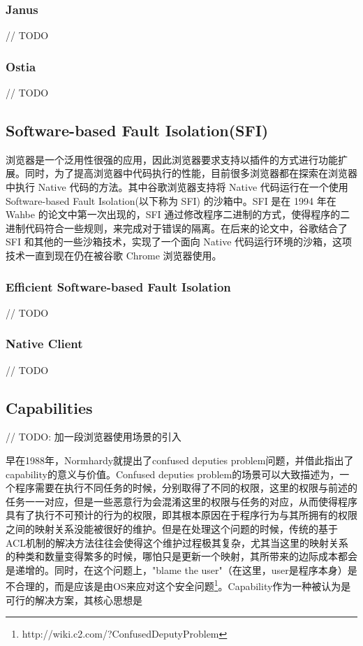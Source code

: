 \documentclass[preprint,12pt]{elsarticle}
\begin{document}
\subsubsection{Janus}
\label{sss:janus}

// TODO

\subsubsection{Ostia}
\label{sss:ostia}

// TODO

\subsection{Software-based Fault Isolation(SFI)}
\label{ss:sfi}

浏览器是一个泛用性很强的应用，因此浏览器要求支持以插件的方式进行功能扩展。同时，为了提高浏览器中代码执行的性能，目前很多浏览器都在探索在浏览器中执行 Native 代码的方法。其中谷歌浏览器支持将 Native 代码运行在一个使用 Software-based Fault Isolation(以下称为 SFI) 的沙箱中。SFI 是在 1994 年在 Wahbe 的论文中第一次出现的\cite{wahbe1994efficient}，SFI 通过修改程序二进制的方式，使得程序的二进制代码符合一些规则，来完成对于错误的隔离。在后来的论文中，谷歌结合了 SFI 和其他的一些沙箱技术，实现了一个面向 Native 代码运行环境的沙箱，这项技术一直到现在仍在被谷歌 Chrome 浏览器使用\cite{nacl}。

\subsubsection{Efficient Software-based Fault Isolation}
\label{sss:esfi}

// TODO

\subsubsection{Native Client}
\label{sss:nacl}

// TODO

\subsection{Capabilities}
\label{ss:capabilities}

// TODO: 加一段浏览器使用场景的引入

早在1988年，Normhardy就提出了confused deputies problem\cite{deputies}问题，并借此指出了capability的意义与价值。Confused deputies problem的场景可以大致描述为，一个程序需要在执行不同任务的时候，分别取得了不同的权限，这里的权限与前述的任务一一对应，但是一些恶意行为会混淆这里的权限与任务的对应，从而使得程序具有了执行不可预计的行为的权限，即其根本原因在于程序行为与其所拥有的权限之间的映射关系没能被很好的维护。但是在处理这个问题的时候，传统的基于ACL机制的解决方法往往会使得这个维护过程极其复杂，尤其当这里的映射关系的种类和数量变得繁多的时候，哪怕只是更新一个映射，其所带来的边际成本都会是递增的。同时，在这个问题上，"blame the user"（在这里，user是程序本身）是不合理的，而是应该是由OS来应对这个安全问题\footnote{http://wiki.c2.com/?ConfusedDeputyProblem}。Capability作为一种被认为是可行的解决方案，其核心思想是
\end{document}
